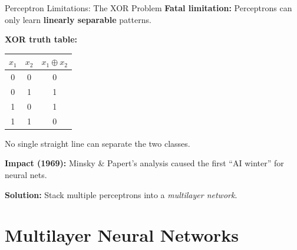 \documentclass[10pt]{beamer}
\begin{document}
\begin{frame}{Perceptron Limitations: The XOR Problem}
    \textbf{Fatal limitation:} Perceptrons can only learn \textbf{linearly separable} patterns.

    \vspace{0.2cm}
    \textbf{XOR truth table:}
    \small
    \begin{tabularx}{0.6\textwidth}{c c c}
        \toprule
        $x_1$ & $x_2$ & $x_1 \oplus x_2$ \\
        \midrule
        0 & 0 & 0 \\
        0 & 1 & 1 \\
        1 & 0 & 1 \\
        1 & 1 & 0 \\
        \bottomrule
    \end{tabularx}

    \normalsize
    \vspace{0.2cm}
    No single straight line can separate the two classes.

    \vspace{0.2cm}
    \textbf{Impact (1969):} Minsky \& Papert's analysis caused the first ``AI winter'' for neural nets.

    \vspace{0.2cm}
    \textbf{Solution:} Stack multiple perceptrons into a \emph{multilayer network}.
\end{frame}

\section{Multilayer Neural Networks}
\end{document}

